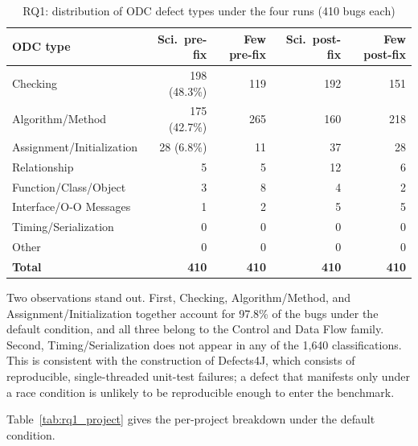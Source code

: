 \documentclass{iutbscthesis}
\begin{document}
\begin{table}[!htbp]
    \centering
    \begin{tabular}{l r r r r}
        \toprule
        \textbf{ODC type} & \textbf{Sci.\ pre-fix} & \textbf{Few pre-fix} & \textbf{Sci.\ post-fix} & \textbf{Few post-fix} \\
        \midrule
        Checking                  & 198 (48.3\%) & 119 & 192 & 151 \\
        Algorithm/Method          & 175 (42.7\%) & 265 & 160 & 218 \\
        Assignment/\allowbreak Initialization & 28 (6.8\%)  & 11  & 37  & 28 \\
        Relationship              & 5            & 5   & 12  & 6 \\
        Function/\allowbreak Class/\allowbreak Object & 3 & 8 & 4  & 2 \\
        Interface/\allowbreak O-O Messages    & 1            & 2   & 5   & 5 \\
        Timing/\allowbreak Serialization      & 0            & 0   & 0   & 0 \\
        Other                     & 0            & 0   & 0   & 0 \\
        \midrule
        \textbf{Total}            & \textbf{410} & \textbf{410} & \textbf{410} & \textbf{410} \\
        \bottomrule
    \end{tabular}
    \caption{RQ1: distribution of ODC defect types under the four runs (410 bugs each)}
    \label{tab:rq1_dist}
\end{table}

Two observations stand out. First, Checking, Algorithm/Method, and Assignment/\allowbreak Initialization together account for 97.8\% of the bugs under the default condition, and all three belong to the Control and Data Flow family. Second, Timing/\allowbreak Serialization does not appear in any of the 1{,}640 classifications. This is consistent with the construction of Defects4J, which consists of reproducible, single-threaded unit-test failures; a defect that manifests only under a race condition is unlikely to be reproducible enough to enter the benchmark.

Table~\ref{tab:rq1_project} gives the per-project breakdown under the default condition.
\end{document}
